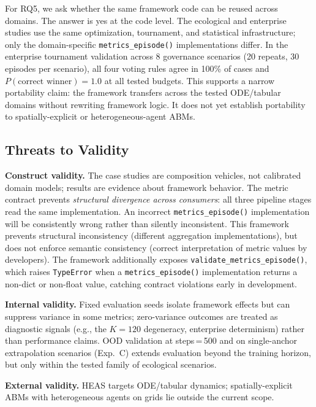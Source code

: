 \documentclass{wscpaperproc}
\begin{document}
For RQ5, we ask whether the same framework code can be reused
across domains. The answer is yes at the code level. The ecological and
enterprise studies use the same optimization, tournament, and statistical
infrastructure; only the domain-specific \texttt{metrics\_episode()}
implementations differ. In the enterprise tournament validation across 8
governance scenarios (20 repeats, 30 episodes per scenario), all four voting
rules agree in 100\% of cases and $P(\text{correct winner})\!=\!1.0$ at all
tested budgets. This supports a narrow portability claim: the framework
transfers across the tested ODE/tabular domains without rewriting framework
logic. It does not yet establish portability to spatially-explicit or
heterogeneous-agent ABMs.

\subsection{Threats to Validity}

\textbf{Construct validity.} The case studies are composition vehicles, not
calibrated domain models; results are evidence about framework behavior. The
metric contract prevents \emph{structural divergence across consumers}: all
three pipeline stages read the same implementation. An incorrect \texttt{metrics\_episode()}
implementation will be consistently wrong rather than silently inconsistent. This framework prevents structural inconsistency (different aggregation implementations), but does not enforce semantic consistency (correct interpretation of metric values by developers). The
framework additionally exposes \texttt{validate\_metrics\_episode()}, which raises
\texttt{TypeError} when a \texttt{metrics\_episode()} implementation returns a
non-dict or non-float value, catching contract violations early in development.

\textbf{Internal validity.} Fixed evaluation seeds isolate framework effects
but can suppress variance in some metrics; zero-variance outcomes are treated as
diagnostic signals (e.g., the $K\!=\!120$ degeneracy, enterprise determinism)
rather than performance claims. OOD validation at steps\,=\,500 and on
single-anchor extrapolation scenarios (Exp.~C) extends evaluation beyond the
training horizon, but only within the tested family of ecological scenarios.

\textbf{External validity.} HEAS targets ODE/tabular dynamics; spatially-explicit ABMs
with heterogeneous agents on grids lie outside the current scope.

\end{document}
